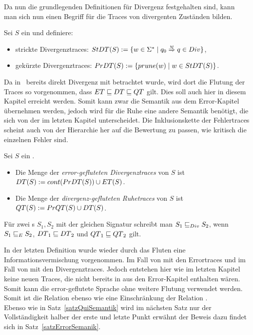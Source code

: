 Da nun die grundlegenden Definitionen für Divergenz festgehalten sind,
kann man sich nun einen Begriff für die Traces von divergenten Zuständen
bilden.\\

\begin{Def}[Divergenztraces]
  Sei $S$ ein \EIO{} und definiere:
  \begin{itemize}
    \item strickte Divergenztraces: $StDT{}(S) := \{w\in\Sigma ^*\mid q_0
      \overset{w}{\Rightarrow} q\in Div\}$,
    \item gekürzte Divergenztraces: $PrDT{}(S) := \{prune (w)\mid
      w\in StDT{}(S)\}$.
  \end{itemize}
\end{Def}

Da in~\cite{Chilton2013} bereits direkt Divergenz mit betrachtet wurde, wird
dort die Flutung der Traces so vorgenommen, dass $ET\sqsubseteq DT\sqsubseteq
QT$ gilt. Dies soll auch hier in diesem Kapitel erreicht werden. Somit kann
zwar die Semantik aus dem Error-Kapitel übernehmen werden, jedoch wird für die
Ruhe eine andere Semantik benötigt, die sich von der im letzten Kapitel
unterscheidet. Die Inklusionskette der Fehlertraces scheint auch von der
Hierarchie her auf die Bewertung zu passen, wie kritisch die einzelnen Fehler
sind.

\begin{Def}
  \label{DefRuheDivSemantik}
  Sei $S$ ein \EIO{}.
  \begin{itemize}
    \item Die Menge der \emph{error-gefluteten Divergenztraces} von $S$ ist
      $DT{}(S) := cont{}(PrDT{}(S))\cup ET{}(S)$.
    \item Die Menge der \emph{divergenz-gefluteten Ruhetraces} von $S$ ist
      $QT{}(S) := PrQT{}(S)\cup DT{}(S)$.
  \end{itemize}
  Für zwei \EIO{}s $S_1, S_2$ mit der gleichen Signatur schreibt man $S_1\sqsubseteq _{Div}
  S_2$, wenn $S_1\sqsubseteq _E S_2$, $DT{}_1\sqsubseteq DT{}_2$ und
  $QT{}_1\sqsubseteq QT{}_2$ gilt.
\end{Def}

In der letzten Definition wurde wieder durch das Fluten eine
Informationsvermischung vorgenommen. Im Fall von \DT{} mit den Errortraces und
im Fall von \QT{} mit den Divergenztraces. Jedoch entstehen hier wie im letzten
Kapitel keine neuen Traces, die nicht bereits in \EL{} aus den Error-Kapitel
enthalten wären. Somit kann die error-geflutete Sprache ohne weitere
Flutung verwendet werden. Somit ist die Relation \DRel{} ebenso wie \QRel{}
eine Einschränkung der Relation \ERel{}.\\
Ebenso wie in Satz~\ref{satzQuiSemantik} wird im nächsten Satz nur der
Vollständigkeit halber der erste und letzte Punkt erwähnt der Beweis dazu
findet sich in Satz~\ref{satzErrorSemanik}.

